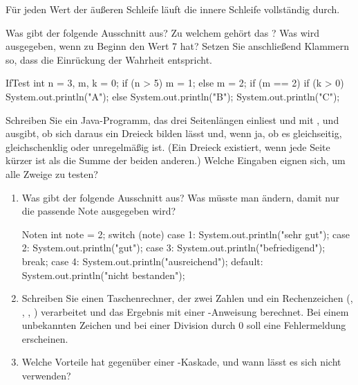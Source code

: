 \smallskip
Für jeden Wert der äußeren Schleife läuft die innere Schleife vollständig durch.

\aufgaben
{}
Was gibt der folgende Ausschnitt aus? Zu welchem  gehört das ? Was wird ausgegeben, wenn  zu Beginn den Wert 7 hat? Setzen Sie anschließend Klammern so, dass die Einrückung der Wahrheit entspricht.
\begin{javacode}[Ausschnitt]{IfTest}
int n = 3, m, k = 0;
if (n > 5) { m = 1; } else { m = 2; }
if (m == 2)
	if (k > 0)
		System.out.println("A");
else
	System.out.println("B");
System.out.println("C");
\end{javacode}

Schreiben Sie ein Java-Programm, das drei Seitenlängen einliest und mit ,  und  ausgibt, ob sich daraus ein Dreieck bilden lässt und, wenn ja, ob es gleichseitig, gleichschenklig oder unregelmäßig ist. (Ein Dreieck existiert, wenn jede Seite kürzer ist als die Summe der beiden anderen.) Welche Eingaben eignen sich, um alle Zweige zu testen?

\begin{enumerate}[label=\alph*)]
\item Was gibt der folgende Ausschnitt aus? Was müsste man ändern, damit nur die passende Note ausgegeben wird?
\begin{javacode}[Ausschnitt]{Noten}
int note = 2;
switch (note) {
	case 1: System.out.println("sehr gut");
	case 2: System.out.println("gut");
	case 3: System.out.println("befriedigend");
		break;
	case 4: System.out.println("ausreichend");
	default: System.out.println("nicht bestanden");
}
\end{javacode}
\item Schreiben Sie einen Taschenrechner, der zwei Zahlen und ein Rechenzeichen (\code{+}, \code{-}, \code{*}, \code{/}) verarbeitet und das Ergebnis mit einer -Anweisung berechnet. Bei einem unbekannten Zeichen und bei einer Division durch 0 soll eine Fehlermeldung erscheinen.
\item Welche Vorteile hat  gegenüber einer -Kaskade, und wann lässt es sich nicht verwenden?
\end{enumerate}

